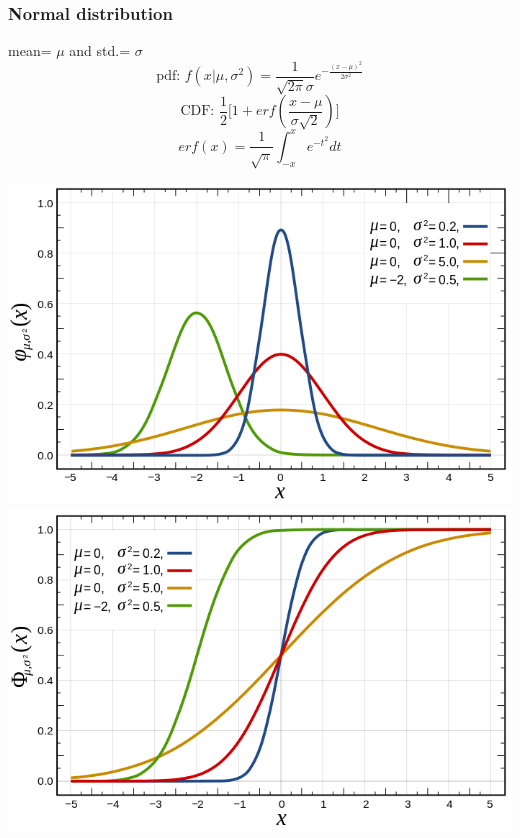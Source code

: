 \documentclass{article}
\begin{document}
{{        \subsubsection{Normal distribution}{
            mean= $\mu $ and std.= $\sigma $
            \[\text{pdf: } \mathit{f}(\mathit{x}| \mu, \sigma^2)= \frac{1}{\sqrt{2\pi} \sigma }\mathit{e}^{-\frac{(\mathit{x}-\mu)^2}{2\sigma^2}}\]
            \[\text{CDF: } \frac{1}{2} \lbrack 1+erf(\frac{\mathit{x}-\mu}{\sigma\sqrt{2}})\rbrack\]
            \[erf(\mathit{x})=\frac{1}{\sqrt{\pi}}\int_{-\mathit{x}}^{\mathit{x}}\mathit{e}^{-t^2}dt\]
            \begin{center}{
                \includegraphics[scale=0.25]{Normal_distribution_pdf.png}\includegraphics[scale=0.25]{Normal_distribution_CDF.png}
            }
            \end{center}
        }
    }
}
\end{document}
